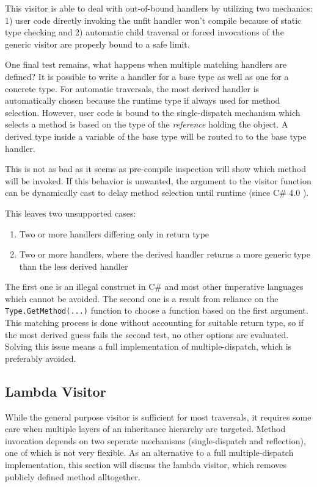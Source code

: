 \documentclass[twoside,openright]{uva-bachelor-thesis}
\newcommand{\code}[1]{\texttt{\footnotesize#1}}
\begin{document}
			This visitor is able to deal with out-of-bound handlers by utilizing two mechanics: 1) user code directly invoking the unfit handler won't compile because of static type checking and 2) automatic child traversal or forced invocations of the generic visitor are properly bound to a safe limit.
			
			One final test remains, what happens when multiple matching handlers are defined? It is possible to write a handler for a base type as well as one for a concrete type. For automatic traversals, the most derived handler is automatically chosen because the runtime type if always used for method selection. However, user code is bound to the single-dispatch mechanism which selects a method is based on the type of the \emph{reference} holding the object. A derived type inside a variable of the base type will be routed to to the base type handler.
			
			This is not as bad as it seems as pre-compile inspection will show which method will be invoked. If this behavior is unwanted, the argument to the visitor function can be dynamically cast to delay method selection until runtime (since C\# 4.0 \cite{schildt2010c}). 
			
			This leaves two unsupported cases:
			\begin{enumerate}
				\item Two or more handlers differing only in return type
				\item Two or more handlers, where the derived handler returns a more generic type than the less derived handler
			\end{enumerate}
			
			The first one is an illegal construct in C\# and most other imperative languages which cannot be avoided. The second one is a result from reliance on the \code{Type.GetMethod(...)} function to choose a function based on the first argument. This matching process is done without accounting for suitable return type, so if the most derived guess fails the second test, no other options are evaluated. Solving this issue means a full implementation of multiple-dispatch, which is preferably avoided.
			
		\subsection{Lambda Visitor}
			While the general purpose visitor is sufficient for most traversals, it requires some care when multiple layers of an inheritance hierarchy are targeted. Method invocation depends on two seperate mechanisms (single-dispatch and reflection), one of which is not very flexible. As an alternative to a full multiple-dispatch implementation, this section will discuss the lambda visitor, which removes publicly defined method alltogether.
			
\end{document}
